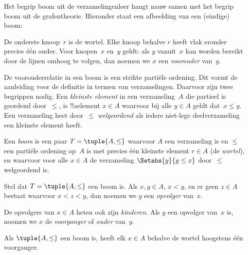 \documentclass[openany]{memoir}
\begin{document}
Het begrip boom uit de verzamelingenleer hangt nauw samen met het
begrip boom uit de grafentheorie. Hieronder staat een afbeelding van
een (eindige) boom:

\begin{center}
\end{center}

De onderste knoop~$r$ is de wortel. Elke knoop behalve $r$ heeft vlak
eronder precies één ouder. Voor knopen~$x$ en~$y$ geldt: als $y$
vanuit~$x$ kan worden bereikt door de lijnen omhoog te volgen, dan
noemen we $x$ een \emph{voorouder} van~$y$.

De voorouderrelatie in een boom is een strikte partiële ordening. Dit
vormt de aanleiding voor de definitie in termen van verzamelingen.
Daarvoor zijn twee begrippen nodig. Een \emph{kleinste element} in een
verzameling~$A$ die partieel is geordend door~$\le$, is !!a{element}
$x \in A$ waarvoor bij alle $y \in A$ geldt dat~$x \le y$. Een
verzameling heet door~$\le$ \emph{welgeordend} als iedere niet-lege
deelverzameling een kleinste element heeft.

\begin{defn}[Boom]
Een \emph{boom} is een paar $T = \tuple{A, \le}$ waarvoor $A$ een
verzameling is en $\le$ een partiële ordening op~$A$ is met precies één
kleinste element $r \in A$ (de \emph{wortel}), en waarvoor voor alle
$x \in A$ de verzameling $\Setabs{y}{y \le x}$ door~$\le$
welgeordend is.
\end{defn}

\begin{defn}[Opvolgers]
Stel dat $T = \tuple{A, \le}$ een boom is.
Als $x,y \in A$, $x < y$, en er geen $z \in A$ bestaat waarvoor
$x < z < y$, dan noemen we $y$ een \emph{opvolger} van~$x$.
\end{defn}

De opvolgers van $x \in A$ heten ook zijn \emph{kinderen}. Als $y$
een opvolger van~$x$ is, noemen we $x$ de \emph{voorganger} of
\emph{ouder} van~$y$.

\begin{prop}
Als $\tuple{A,\le}$ een boom is, heeft elk $x \in A$ behalve de wortel
hoogstens één voorganger.
\end{prop}
\end{document}
